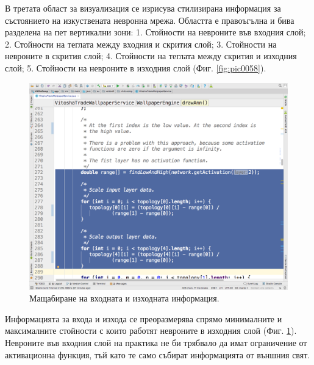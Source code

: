 \documentclass[book,14pt,oneside,openany]{memoir}
\begin{document}
В третата област за визуализация се изрисува стилизирана информация за състоянието на изкуствената невронна мрежа. Областта е правоъгълна и бива разделена на пет вертикални зони: 1. Стойности на невроните във входния слой; 2. Стойности на теглата между входния и скрития слой; 3. Стойности на невроните в скрития слой; 4. Стойности на теглата между скрития и изходния слой; 5. Стойности на невроните в изходния слой (Фиг. \ref{fig:pic0058}).

\begin{figure}[h]
  \centering
  \includegraphics[height=0.45\pdfpageheight]{./images/pic0059.png}
  \caption{Мащабиране на входната и изходната информация.}
\label{fig:pic0059}
\end{figure}
\FloatBarrier

Информацията за входа и изхода се преоразмерява спрямо минималните и максималните стойности с които работят невроните в изходния слой (Фиг. \ref{fig:pic0059}). Невроните във входния слой на практика не би трябвало да имат ограничение от активационна функция, тъй като те само събират информацията от външния свят. 
\end{document}
